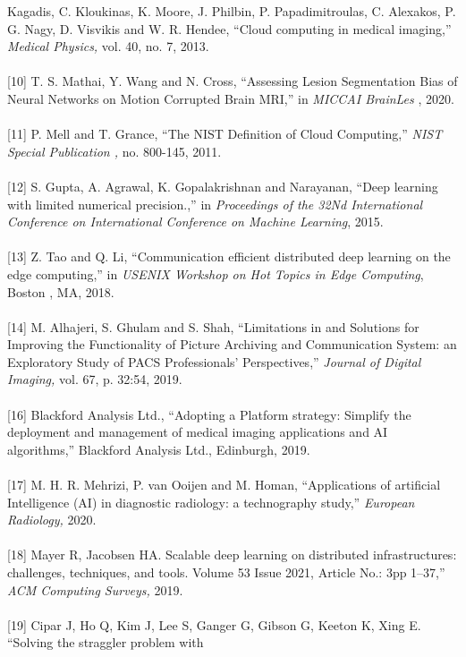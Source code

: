 Kagadis, C. Kloukinas, K. Moore, J. Philbin, P. Papadimitroulas, C.
Alexakos, P. G. Nagy, D. Visvikis and W. R. Hendee, ``Cloud computing in
medical imaging,'' \emph{Medical Physics,} vol. 40, no. 7, 2013.
\\\\{[}10{]} T. S. Mathai, Y. Wang and N. Cross, ``Assessing Lesion
Segmentation Bias of Neural Networks on Motion Corrupted Brain MRI,'' in
\emph{MICCAI BrainLes} , 2020. \\\\{[}11{]} P. Mell and T. Grance, ``The
NIST Definition of Cloud Computing,'' \emph{NIST Special Publication ,}
no. 800-145, 2011. \\\\{[}12{]} S. Gupta, A. Agrawal, K. Gopalakrishnan and
Narayanan, ``Deep learning with limited numerical precision.,'' in
\emph{Proceedings of the 32Nd International Conference on International
Conference on Machine Learning}, 2015. \\\\{[}13{]} Z. Tao and Q. Li,
``Communication efficient distributed deep learning on the edge
computing,'' in \emph{USENIX Workshop on Hot Topics in Edge Computing},
Boston , MA, 2018. \\\\{[}14{]} M. Alhajeri, S. Ghulam and S. Shah,
``Limitations in and Solutions for Improving the Functionality of
Picture Archiving and Communication System: an Exploratory Study of PACS
Professionals' Perspectives,'' \emph{Journal of Digital Imaging,} vol.
67, p. 32:54, 2019. \\\\{[}16{]} Blackford Analysis Ltd., ``Adopting a Platform
strategy: Simplify the deployment and management of medical imaging
applications and AI algorithms,'' Blackford Analysis Ltd., Edinburgh,
2019.\\\\{[}17{]} M. H. R. Mehrizi, P. van Ooijen and M. Homan,
``Applications of artificial Intelligence (AI) in diagnostic radiology:
a technography study,'' \emph{European Radiology,} 2020. \\\\{[}18{]} Mayer R, Jacobsen HA. Scalable deep learning on distributed infrastructures: challenges, techniques, and tools. Volume 53 Issue 2021, Article No.: 3pp 1–37,'' \emph{ACM Computing
Surveys,} 2019. \\\\{[}19{]} Cipar J, Ho Q, Kim J, Lee S, Ganger G, Gibson G, Keeton K, Xing E.  ``Solving the straggler problem with
